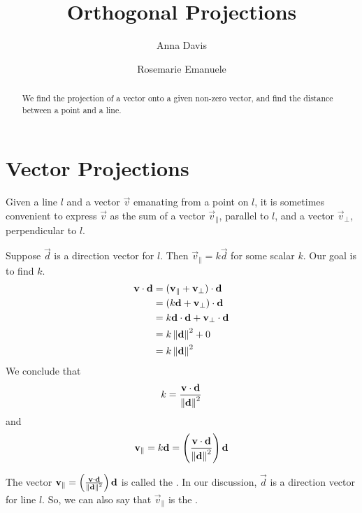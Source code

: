 \documentclass{ximera}
\author{Anna Davis \and Rosemarie Emanuele} \title{Orthogonal Projections} \license{CC-BY 4.0}
\begin{document}
\begin{abstract}
 We find the projection of a vector onto a given non-zero vector, and find the distance between a point and a line.
\end{abstract}
\maketitle

\section*{Vector Projections}

Given a line $l$ and a vector $\vec{v}$ emanating from a point on $l$, it is sometimes convenient to express $\vec{v}$ as the sum of a vector $\vec{v}_{\parallel}$, parallel to $l$, and a vector $\vec{v}_{\perp}$, perpendicular to $l$.

\begin{image}[2in]

\end{image}

Suppose $\vec{d}$ is a direction vector for $l$.  Then $\vec{v}_
{\parallel}=k\vec{d}$ for some scalar $k$.  Our goal is to find $k$.  
\begin{align*}{\bf v}\cdot{\bf d}&=({\bf v}_{\parallel}+{\bf v}_{\perp})\cdot{\bf d}\\
&=(k{\bf d}+{\bf v}_{\perp})\cdot{\bf d}\\
&=k{\bf d}\cdot{\bf d}+{\bf v}_{\perp}\cdot{\bf d}\\
&=k\left\lVert{\bf d}\right\rVert^2+0\\
&=k\left\lVert{\bf d}\right\rVert^2
\end{align*}
We conclude that $$k=\frac{{\bf v}\cdot{\bf d}}{\left\lVert{\bf d}\right\rVert^2}$$
and $${\bf v}_{\parallel}=k{\bf d}=\left(\frac{{\bf v}\cdot{\bf d}}{\left\lVert{\bf d}\right\rVert^2}\right){\bf d}$$

The vector ${\bf v}_{\parallel}=\left(\frac{{\bf v}\cdot{\bf d}}{\left\lVert{\bf d}\right\rVert^2}\right){\bf d}$ is called the .  In our discussion, $\vec{d}$ is a direction vector for line $l$.  So, we can also say that $\vec{v}_{\parallel}$ is the .
\end{document}
